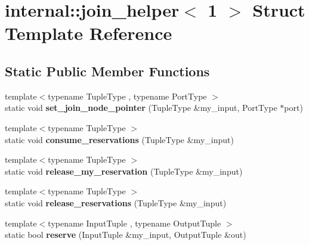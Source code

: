\hypertarget{structinternal_1_1join__helper_3_011_01_4}{}\section{internal\+:\+:join\+\_\+helper$<$ 1 $>$ Struct Template Reference}
\label{structinternal_1_1join__helper_3_011_01_4}
\subsection*{Static Public Member Functions}
\begin{DoxyCompactItemize}
\item 
\hypertarget{structinternal_1_1join__helper_3_011_01_4_aad24667dbb4a4190733d1cc2887d2c8a}{}{\footnotesize template$<$typename Tuple\+Type , typename Port\+Type $>$ }\\static void {\bfseries set\+\_\+join\+\_\+node\+\_\+pointer} (Tuple\+Type \&my\+\_\+input, Port\+Type $\ast$port)\label{structinternal_1_1join__helper_3_011_01_4_aad24667dbb4a4190733d1cc2887d2c8a}

\item 
\hypertarget{structinternal_1_1join__helper_3_011_01_4_a46bc8a4957a0d3386900811c32d52b6a}{}{\footnotesize template$<$typename Tuple\+Type $>$ }\\static void {\bfseries consume\+\_\+reservations} (Tuple\+Type \&my\+\_\+input)\label{structinternal_1_1join__helper_3_011_01_4_a46bc8a4957a0d3386900811c32d52b6a}

\item 
\hypertarget{structinternal_1_1join__helper_3_011_01_4_ac5d9a9bb8ec0095b3c58e066a612751b}{}{\footnotesize template$<$typename Tuple\+Type $>$ }\\static void {\bfseries release\+\_\+my\+\_\+reservation} (Tuple\+Type \&my\+\_\+input)\label{structinternal_1_1join__helper_3_011_01_4_ac5d9a9bb8ec0095b3c58e066a612751b}

\item 
\hypertarget{structinternal_1_1join__helper_3_011_01_4_ade8f6bab02c08f4c8ad2e18147ad45f4}{}{\footnotesize template$<$typename Tuple\+Type $>$ }\\static void {\bfseries release\+\_\+reservations} (Tuple\+Type \&my\+\_\+input)\label{structinternal_1_1join__helper_3_011_01_4_ade8f6bab02c08f4c8ad2e18147ad45f4}

\item 
\hypertarget{structinternal_1_1join__helper_3_011_01_4_a7f1a1b727d6849fcc51b387cda8e0bc0}{}{\footnotesize template$<$typename Input\+Tuple , typename Output\+Tuple $>$ }\\static bool {\bfseries reserve} (Input\+Tuple \&my\+\_\+input, Output\+Tuple \&out)\label{structinternal_1_1join__helper_3_011_01_4_a7f1a1b727d6849fcc51b387cda8e0bc0}


\end{DoxyCompactItemize}
